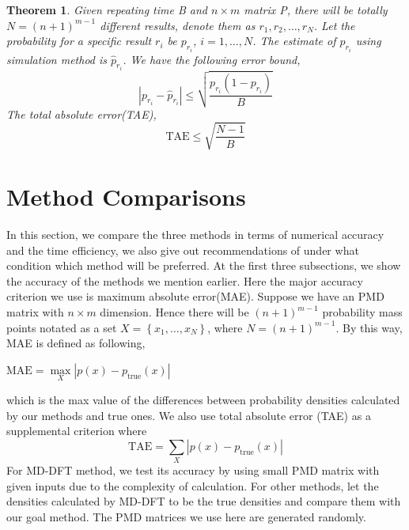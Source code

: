 \documentclass[12pt]{article}
\newtheorem{thm}{Theorem}
\begin{document}
\begin{thm}
Given repeating time \mbox{B} and $n \times m$ matrix \mbox{P}, there will be totally  $N=(n+1)^{m-1}$ different results, denote them as $r_{1},r_{2},\dots,r_{N}$. Let the probability for a specific result $r_{i}$ be $p_{r_{i}}$, $i=1,\dots,N$. The estimate of  $p_{r_{i}}$ using simulation method is $\hat{p}_{r_i}$. We have the following error bound,
\begin{equation*}
    |p_{r_i} - \hat{p}_{r_i}| \leq \sqrt{\frac{p_{r_i}(1-p_{r_i})}{B}}
\end{equation*}
The total absolute error(\mbox{TAE}),
\begin{equation*}
    \mbox{TAE} \leq \sqrt{\frac{N-1}{B}}
\end{equation*}

\end{thm}

\section{Method Comparisons}\label{sec:Method Comparisons}
In this section, we compare the three methods in terms of numerical accuracy and the time efficiency, we also give out recommendations of under what condition which method will be preferred. At the first three subsections, we show the accuracy of the methods we mention earlier. Here the major accuracy criterion we use is maximum absolute error(MAE). Suppose we have an PMD matrix with $n\times m$ dimension. Hence there will be $(n+1)^{m-1}$ probability mass points notated as a set $X = \left\{x_1,\dots,x_{N}\right\}$, where $N=(n+1)^{m-1}$. By this way, MAE is defined as following,
\begin{center}
$\mathrm{MAE} = \underset{X}{\max}|p(x) - p_{\text{true}}(x)|$
\end{center}
which is the max value of the differences between probability densities calculated by our methods and true ones.
We also use total absolute error (TAE) as a supplemental criterion where
\begin{equation*}
    \mbox{TAE} = \sum_X |p(x) - p_{\text{true}}(x)|
\end{equation*}
For MD-DFT method, we test its accuracy by using small PMD matrix with given inputs due to the complexity of calculation. For other methods, let the densities calculated by MD-DFT to be the true densities and compare them with our goal method. The PMD matrices we use here are generated randomly.
\end{document}
